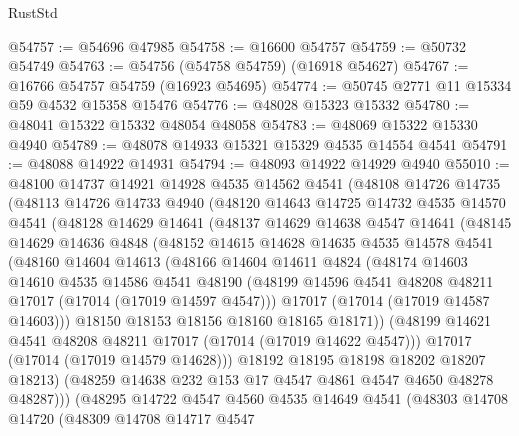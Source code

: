 \begin{lexlean}{RustStd}
\begin{coremodule}
@54757 := @54696 @47985
@54758 := @16600 @54757
@54759 := @50732 @54749
@54763 := @54756 (@54758 @54759) (@16918 @54627)
@54767 := @16766 @54757 @54759 (@16923 @54695)
@54774 := @50745 @2771 @11 @15334 @59 @4532 @15358 @15476
@54776 := @48028 @15323 @15332
@54780 := @48041 @15322 @15332 @48054 @48058
@54783 := @48069 @15322 @15330 @4940
@54789 := @48078 @14933 @15321 @15329 @4535 @14554 @4541
@54791 := @48088 @14922 @14931
@54794 := @48093 @14922 @14929 @4940
@55010 := @48100
    @14737
    @14921
    @14928
    @4535
    @14562
    @4541
    (@48108
      @14726
      @14735
      (@48113
        @14726
        @14733
        @4940
        (@48120
          @14643
          @14725
          @14732
          @4535
          @14570
          @4541
          (@48128
            @14629
            @14641
            (@48137
              @14629
              @14638
              @4547
              @14641
              (@48145
                @14629
                @14636
                @4848
                (@48152
                  @14615
                  @14628
                  @14635
                  @4535
                  @14578
                  @4541
                  (@48160
                    @14604
                    @14613
                    (@48166
                      @14604
                      @14611
                      @4824
                      (@48174
                        @14603
                        @14610
                        @4535
                        @14586
                        @4541
                        @48190
                        (@48199 @14596 @4541 @48208 @48211 @17017 (@17014 (@17019 @14597 @4547)))
                        @17017
                        (@17014 (@17019 @14587 @14603)))
                      @18150
                      @18153
                      @18156
                      @18160
                      @18165
                      @18171))
                  (@48199 @14621 @4541 @48208 @48211 @17017 (@17014 (@17019 @14622 @4547)))
                  @17017
                  (@17014 (@17019 @14579 @14628)))
                @18192
                @18195
                @18198
                @18202
                @18207
                @18213)
              (@48259 @14638 @232 @153 @17 @4547 @4861 @4547 @4650 @48278 @48287)))
          (@48295
            @14722
            @4547
            @4560
            @4535
            @14649
            @4541
            (@48303
              @14708
              @14720
              (@48309
                @14708
                @14717
                @4547

\end{coremodule}
\end{lexlean}
